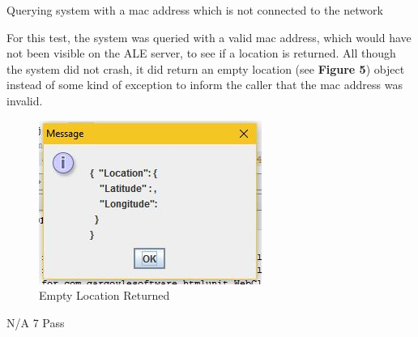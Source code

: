 \FuncReq
{Querying system with a mac address which is not connected to the network}
{For this test, the system was queried with a valid mac address, which would have not been visible on the ALE server, to see if a location is returned. All though the system did not crash, it did return an empty location (see \textbf{Figure 5}) object instead of some kind of exception to inform the caller that the mac address was invalid.
			\begin{figure}[h]
				\centering
				\includegraphics{functional/images/wrong_mac.jpg}
				\caption{Empty Location Returned}
				\label{fig:LocationReturned}
			\end{figure}
}
{N/A}
{7}
{Pass}
